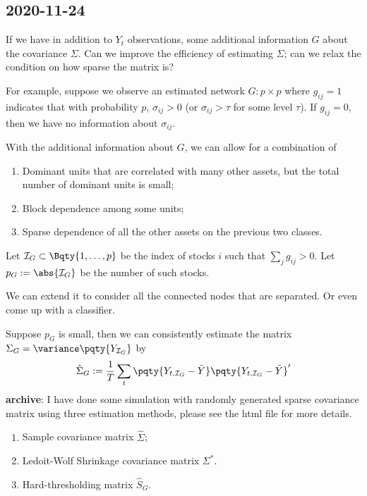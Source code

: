 \subsection{2020-11-24}
    If we have in addition to \(Y_{t}\) observations, some additional information \(G\) about the covariance \(\Sigma\). Can we improve the efficiency of estimating \(\Sigma\); can we relax the condition on how sparse the matrix is?

    For example, suppose we observe an estimated network  \(G: p \times p\) where \(g_{ij} = 1\) indicates that with probability \(p\), \(\sigma_{ij} > 0\) (or \(\sigma_{ij} > \tau\) for some level \(\tau\)). If \(g_{ij} =0\), then we have no information about \(\sigma_{ij}\). 

    With the additional information about \(G\), we can allow for a combination of
    \begin{enumerate}
        \item Dominant units that are correlated with many other assets, but the total number of dominant units is small;
        \item Block dependence among some units; 
        \item Sparse dependence of all the other assets on the previous two classes. 
    \end{enumerate}

    Let \(\mathcal{I}_{G}\subset \Bqty{1,\dots,p}\) be the index of stocks \(i\) such that \(\sum_{j} g_{ij} > 0\). Let \(p_{G} := \abs{\mathcal{I}_{G}}\) be the number of such stocks. 

    \begin{remark}
        We can extend it to consider all the connected nodes that are separated. Or even come up with a classifier. 
    \end{remark}

    Suppose \(p_{G}\) is small, then we can consistently estimate the matrix \(\Sigma_{G} = \variance\pqty{Y_{\mathcal{I}_{G}}}\) by 
    \begin{equation}
        \hat{\Sigma}_{G} := \frac{1}{T} \sum_{t} \pqty{Y_{t,\mathcal{I}_{G}} - \bar{Y}}\pqty{Y_{t,\mathcal{I}_{G}} - \bar{Y}}'
    \end{equation}
    \textbf{archive}:
    I have done some simulation with randomly generated sparse covariance matrix using three estimation methods, please see the html file for more details. 
    \begin{enumerate}
        \item Sample covariance matrix \(\hat{\Sigma}\);
        \item Ledoit-Wolf Shrinkage covariance matrix \(\Sigma^{*}\).
        \item Hard-thresholding matrix \(\hat{S}_{G}\).
    \end{enumerate}

